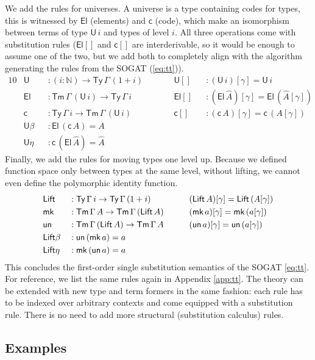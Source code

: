 \documentclass[sigplan,10pt,anonymous,review]{acmart}\settopmatter{printfolios=true,printccs=false,printacmref=false}
\newcommand{\ra}{\rightarrow}
\newcommand{\Ty}{\mathsf{Ty}}
\newcommand{\Tm}{\mathsf{Tm}}
\newcommand{\N}{\mathbb{N}}
\newcommand{\U}{\mathsf{U}}
\newcommand{\El}{\mathsf{El}}
\newcommand{\cd}{\mathsf{c}}
\newcommand{\Lift}{\mathsf{Lift}}
\newcommand{\mk}{\mathsf{mk}}
\newcommand{\un}{\mathsf{un}}
\begin{document}
We add the rules for universes. A universe is a type containing codes
for types, this is witnessed by $\El$ (elements) and $\cd$ (code),
which make an isomorphism between terms of type $\U\,i$ and types of
level $i$. All three operations come with substitution rules ($\El[]$
and $\cd[]$ are interderivable, so it would be enough to assume one of
the two, but we add both to completely align with the algorithm
\cite{DBLP:conf/fscd/KaposiX24} generating the rules from the SOGAT
(\ref{eq:tt})).
\begin{alignat*}{10}
  & \U && : (i:\N)\ra\Ty\,\Gamma\,(1+i)\hspace{2em} && \U[] && : (\U\,i)[\gamma] = \U\,i \\
  & \El && : \Tm\,\Gamma\,(\U\,i) \ra \Ty\,\Gamma\,i && \El[] && : (\El\,\hat{A})[\gamma] = \El\,(\hat{A}[\gamma]) \\
  & \cd && : \Ty\,\Gamma\,i\ra\Tm\,\Gamma\,(\U\,i) && \cd[] && : (\cd\,A)[\gamma] = \cd\,(A[\gamma]) \\
  & \U\beta && : \El\,(\cd\,A) = A \\
  & \U\eta && : \cd\,(\El\,\hat{A}) = \hat{A}
\end{alignat*}
Finally, we add the rules for moving types one level up. Because we
defined function space only between types at the same level, without
lifting, we cannot even define the polymorphic identity function.
\begin{alignat*}{10}
  & \Lift && : \Ty\,\Gamma\,i\ra\Ty\,\Gamma\,(1+i)\hspace{3.5em} && (\Lift\,A)[\gamma] = \Lift\,(A[\gamma]) \\
  & \mk && : \Tm\,\Gamma\,A \ra \Tm\,\Gamma\,(\Lift\,A) && (\mk\,a)[\gamma] = \mk\,(a[\gamma]) \\
  & \un && : \Tm\,\Gamma\,(\Lift\,A) \ra \Tm\,\Gamma\,A && (\un\,a)[\gamma] = \un\,(a[\gamma]) \\
  & \Lift\beta && : \un\,(\mk\,a) = a \\
  & \Lift\eta && : \mk\,(\un\,a) = a
\end{alignat*}
This concludes the first-order single substitution semantics of the
SOGAT \ref{eq:tt}. For reference, we list the same rules again in
Appendix \ref{app:tt}. The theory can be extended with new type and
term formers in the same fashion: each rule has to be indexed over
arbitrary contexts and come equipped with a substitution rule. There
is no need to add more structural (substitution calculus) rules.

\subsection{Examples}
\end{document}
